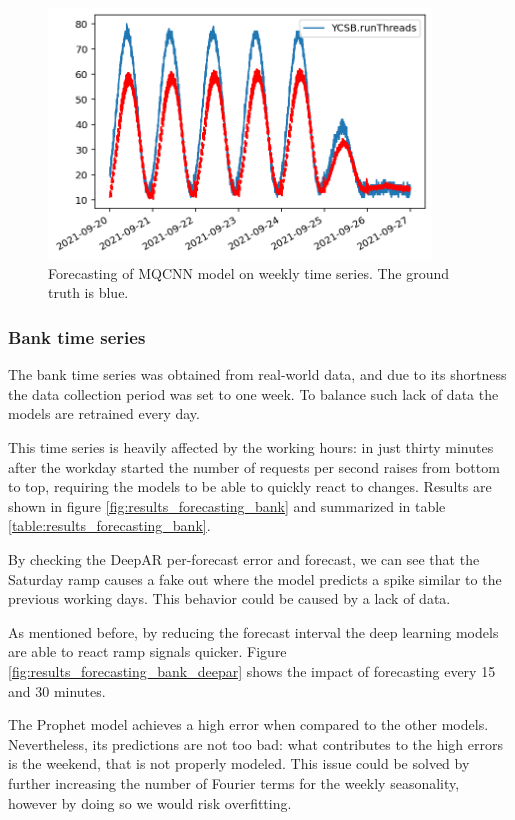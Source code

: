 \documentclass[a4paper, 12pt]{article} %
\begin{document}
	\begin{figure} \centering
		\includegraphics[width=4in]{img/results_forecasting_weekly_mqcnn.png}
		\caption{Forecasting of MQCNN model on weekly time series. The ground truth is blue.}
		\label{fig:results_forecasting_weekly_mqcnn}
	\end{figure}
	
	\clearpage
	\subsubsection{Bank time series} \label{sssec:results_forecasting_bank}
	The bank time series was obtained from real-world data, and due to its shortness the data collection period was set to one week. To balance such lack of data the models are retrained every day. 
	
	This time series is heavily affected by the working hours: in just thirty minutes after the workday started the number of requests per second raises from bottom to top, requiring the models to be able to quickly react to changes. Results are shown in figure \ref{fig:results_forecasting_bank} and summarized in table \ref{table:results_forecasting_bank}. 
	
	By checking the DeepAR per-forecast error and forecast, we can see that the Saturday ramp causes a fake out where the model predicts a spike similar to the previous working days. This behavior could be caused by a lack of data.
	
	As mentioned before, by reducing the forecast interval the deep learning models are able to react ramp signals quicker. Figure \ref{fig:results_forecasting_bank_deepar} shows the impact of forecasting every 15 and 30 minutes.
	
	The Prophet model achieves a high error when compared to the other models. Nevertheless, its predictions are not too bad: what contributes to the high errors is the weekend, that is not properly modeled. This issue could be solved by further increasing the number of Fourier terms for the weekly seasonality, however by doing so we would risk overfitting.
	
\end{document}
